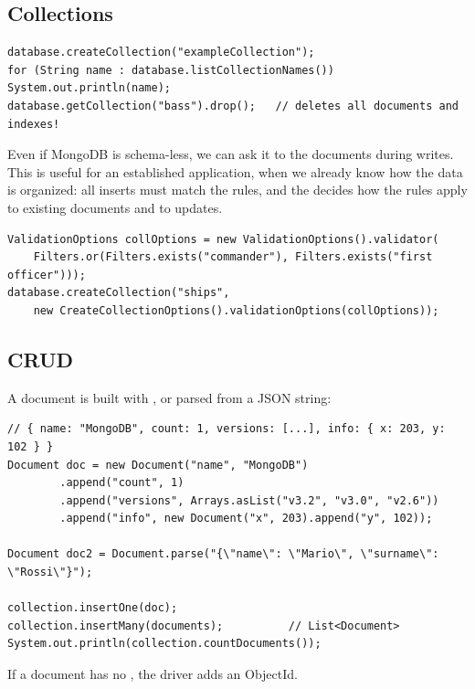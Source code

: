 \subsection{Collections}
\begin{lstlisting}
database.createCollection("exampleCollection");
for (String name : database.listCollectionNames()) System.out.println(name);
database.getCollection("bass").drop();   // deletes all documents and indexes!
\end{lstlisting}
Even if MongoDB is schema-less, we can ask it to  the documents during writes. This is useful for an established application, when we already know how the data is organized: all inserts must match the rules, and the  decides how the rules apply to existing documents and to updates.
\begin{lstlisting}
ValidationOptions collOptions = new ValidationOptions().validator(
    Filters.or(Filters.exists("commander"), Filters.exists("first officer")));
database.createCollection("ships",
    new CreateCollectionOptions().validationOptions(collOptions));
\end{lstlisting}

\subsection{CRUD}
A document is built with , or parsed from a JSON string:
\begin{lstlisting}
// { name: "MongoDB", count: 1, versions: [...], info: { x: 203, y: 102 } }
Document doc = new Document("name", "MongoDB")
        .append("count", 1)
        .append("versions", Arrays.asList("v3.2", "v3.0", "v2.6"))
        .append("info", new Document("x", 203).append("y", 102));

Document doc2 = Document.parse("{\"name\": \"Mario\", \"surname\": \"Rossi\"}");

collection.insertOne(doc);
collection.insertMany(documents);          // List<Document>
System.out.println(collection.countDocuments());
\end{lstlisting}
If a document has no , the driver adds an ObjectId.

